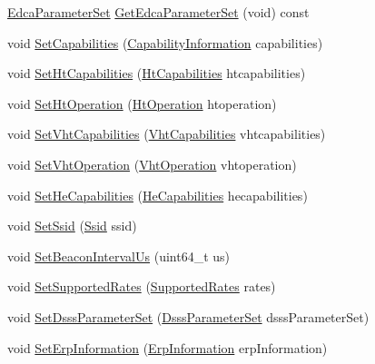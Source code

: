 \begin{DoxyCompactItemize}
\item 
\hyperlink{classns3_1_1EdcaParameterSet}{Edca\+Parameter\+Set} \hyperlink{classns3_1_1MgtProbeResponseHeader_a3709974ccd5540e078f04e0acd4174f4}{Get\+Edca\+Parameter\+Set} (void) const 
\item 
void \hyperlink{classns3_1_1MgtProbeResponseHeader_a1bf36b9ba47bd7f874dbf216e6534ea7}{Set\+Capabilities} (\hyperlink{classns3_1_1CapabilityInformation}{Capability\+Information} capabilities)
\item 
void \hyperlink{classns3_1_1MgtProbeResponseHeader_a4e1867659860b6f230fc25760905ab0a}{Set\+Ht\+Capabilities} (\hyperlink{classns3_1_1HtCapabilities}{Ht\+Capabilities} htcapabilities)
\item 
void \hyperlink{classns3_1_1MgtProbeResponseHeader_a208e7720800fabfde5c26912c3269d70}{Set\+Ht\+Operation} (\hyperlink{classns3_1_1HtOperation}{Ht\+Operation} htoperation)
\item 
void \hyperlink{classns3_1_1MgtProbeResponseHeader_a480a383be603c55886be7ffc057899f5}{Set\+Vht\+Capabilities} (\hyperlink{classns3_1_1VhtCapabilities}{Vht\+Capabilities} vhtcapabilities)
\item 
void \hyperlink{classns3_1_1MgtProbeResponseHeader_a82bf071fcd757ca714dd18492b51f5c3}{Set\+Vht\+Operation} (\hyperlink{classns3_1_1VhtOperation}{Vht\+Operation} vhtoperation)
\item 
void \hyperlink{classns3_1_1MgtProbeResponseHeader_a253543151670cc3aa5b95a1cbc775556}{Set\+He\+Capabilities} (\hyperlink{classns3_1_1HeCapabilities}{He\+Capabilities} hecapabilities)
\item 
void \hyperlink{classns3_1_1MgtProbeResponseHeader_a7c7f6af47ec6074a638ae460cb4620d2}{Set\+Ssid} (\hyperlink{classns3_1_1Ssid}{Ssid} ssid)
\item 
void \hyperlink{classns3_1_1MgtProbeResponseHeader_ab31645e17aa55f4caa3ebe7effdeeffd}{Set\+Beacon\+Interval\+Us} (uint64\+\_\+t us)
\item 
void \hyperlink{classns3_1_1MgtProbeResponseHeader_a88213c5af3dab3e4ed0f611687ad44e9}{Set\+Supported\+Rates} (\hyperlink{classns3_1_1SupportedRates}{Supported\+Rates} rates)
\item 
void \hyperlink{classns3_1_1MgtProbeResponseHeader_ab05d1ec0fe1eb3c92d1b094331ccd4f9}{Set\+Dsss\+Parameter\+Set} (\hyperlink{classns3_1_1DsssParameterSet}{Dsss\+Parameter\+Set} dsss\+Parameter\+Set)
\item 
void \hyperlink{classns3_1_1MgtProbeResponseHeader_a0af2ec3c651f5e2485da29e0ae5cc249}{Set\+Erp\+Information} (\hyperlink{classns3_1_1ErpInformation}{Erp\+Information} erp\+Information)

\end{DoxyCompactItemize}
